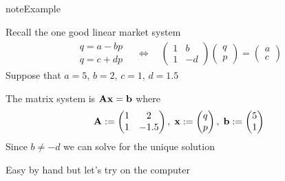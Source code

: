 \documentclass[letterpaper,10pt,english]{jupyterBook}
\begin{document}
\begin{sphinxadmonition}{note}{Example}

\sphinxAtStartPar
Recall the one good linear market system
\begin{equation*}
\begin{split}
%
\begin{array}{c}
q = a - b p \\
q = c + d p
\end{array}
\quad \iff \quad
\begin{pmatrix}
1 & b \\
1 & -d
\end{pmatrix}
\begin{pmatrix}
q\\
p
\end{pmatrix}
=
\begin{pmatrix}
a \\
c 
\end{pmatrix}
%
\end{split}
\end{equation*}
\sphinxAtStartPar
Suppose that \(a=5\), \(b=2\), \(c=1\), \(d=1.5\)

\sphinxAtStartPar
The matrix system is \({\bf A} {\bf x} = {\bf b}\) where
\begin{equation*}
\begin{split}
%
{\bf A} :=
\begin{pmatrix}
1 & 2 \\
1 & -1.5
\end{pmatrix},
\;
{\bf x} :=
\begin{pmatrix}
q\\
p
\end{pmatrix},
\;
{\bf b} :=
\begin{pmatrix}
5 \\
1 
\end{pmatrix}
%
\end{split}
\end{equation*}
\sphinxAtStartPar
Since \(b \ne -d\) we can solve for the unique solution
\end{sphinxadmonition}

\sphinxAtStartPar
Easy by hand but let’s try on the computer
\end{document}
